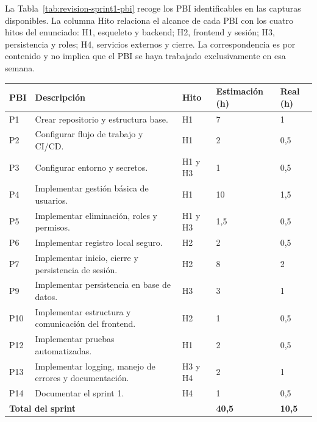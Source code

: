 La Tabla~\ref{tab:revision-sprint1-pbi} recoge los PBI identificables en las capturas disponibles. La columna Hito relaciona el alcance de cada PBI con los cuatro hitos del enunciado: H1, esqueleto y backend; H2, frontend y sesión; H3, persistencia y roles; H4, servicios externos y cierre. La correspondencia es por contenido y no implica que el PBI se haya trabajado exclusivamente en esa semana.

\begin{center}
\begin{minipage}{\textwidth}
\centering
\small
\renewcommand{\arraystretch}{1.25}
\begin{tabular}{|p{}|p{}|p{}|p{}|p{}|}
\hline
\textbf{PBI} & \textbf{Descripción} & \textbf{Hito} & \textbf{Estimación (h)} & \textbf{Real (h)} \\ \hline
P1 & Crear repositorio y estructura base. & H1 & 7 & 1 \\ \hline
P2 & Configurar flujo de trabajo y CI/CD. & H1 & 2 & 0,5 \\ \hline
P3 & Configurar entorno y secretos. & H1 y H3 & 1 & 0,5 \\ \hline
P4 & Implementar gestión básica de usuarios. & H1 & 10 & 1,5 \\ \hline
P5 & Implementar eliminación, roles y permisos. & H1 y H3 & 1,5 & 0,5 \\ \hline
P6 & Implementar registro local seguro. & H2 & 2 & 0,5 \\ \hline
P7 & Implementar inicio, cierre y persistencia de sesión. & H2 & 8 & 2 \\ \hline
P9 & Implementar persistencia en base de datos. & H3 & 3 & 1 \\ \hline
P10 & Implementar estructura y comunicación del frontend. & H2 & 1 & 0,5 \\ \hline
P12 & Implementar pruebas automatizadas. & H1 & 2 & 0,5 \\ \hline
P13 & Implementar logging, manejo de errores y documentación. & H3 y H4 & 2 & 1 \\ \hline
P14 & Documentar el sprint 1. & H4 & 1 & 0,5 \\ \hline
\multicolumn{3}{|l|}{\textbf{Total del sprint}} & \textbf{40,5} & \textbf{10,5} \\ \hline
\end{tabular}
\captionsetup{hypcap=false}
\label{tab:revision-sprint1-pbi}
\end{minipage}
\end{center}

